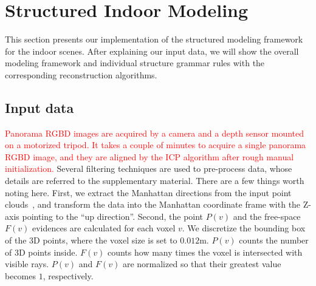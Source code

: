 \section{Structured Indoor Modeling} \label{section:room}

This section presents our implementation of the structured modeling
framework for the indoor scenes.
%
After explaining our input data, we will show the overall modeling framework and individual
structure grammar rules with the corresponding reconstruction
algorithms.

\subsection{Input data}
\textcolor{red}{Panorama RGBD images are acquired by a camera and a depth sensor mounted on a motorized tripod. It takes a couple of minutes to acquire a single panorama RGBD image, and they are aligned by the ICP algorithm after rough manual initialization.} Several filtering techniques are used to pre-process data, 
whose details are referred to the supplementary material. There are a few things worth noting here.
First, we extract the Manhattan directions from the input point
clouds~\cite{ManhattanWorldStereo}, and transform the data into the
Manhattan coordinate frame with the Z-axis pointing to the ``up
direction''. Second,
%
%
the point $P(v)$ and the free-space $F(v)$ evidences are calculated for
each voxel $v$.
We discretize the bounding box of the 3D points, where the voxel size is
set to $0.012\mbox{m}$.
$P(v)$ counts the number of 3D points inside. $F(v)$ counts how many
times the voxel is intersected with visible rays. $P(v)$ and $F(v)$ are
normalized so that their greatest value becomes $1$, respectively.


